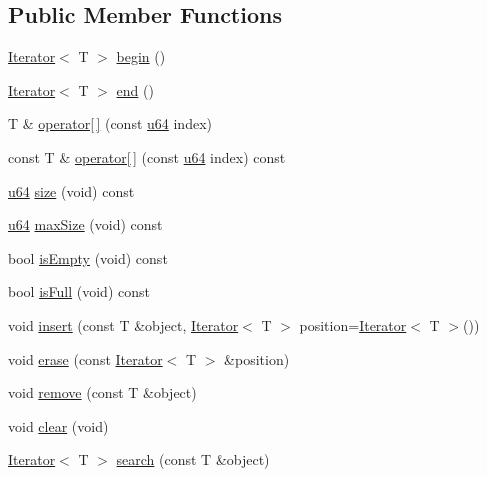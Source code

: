 \subsection*{Public Member Functions}
\begin{DoxyCompactItemize}
\item 
\hyperlink{class_iterator}{Iterator}$<$ T $>$ \hyperlink{classcrap_1_1container_1_1_list_acbb19f69f1378d0d36d9a4ea17595673}{begin} ()
\item 
\hyperlink{class_iterator}{Iterator}$<$ T $>$ \hyperlink{classcrap_1_1container_1_1_list_a59179e116c59aaed4737b4de74147f38}{end} ()
\item 
T \& \hyperlink{classcrap_1_1container_1_1_list_aa133af9cfb90b5f0c6068e5ae8532f70}{operator\mbox{[}$\,$\mbox{]}} (const \hyperlink{types_8h_a3f7e2bcbb0b4c338f3c4f6c937cd4234}{u64} index)
\item 
const T \& \hyperlink{classcrap_1_1container_1_1_list_a9e7bb6861d0c924cb09e06334ac7cce1}{operator\mbox{[}$\,$\mbox{]}} (const \hyperlink{types_8h_a3f7e2bcbb0b4c338f3c4f6c937cd4234}{u64} index) const
\item 
\hyperlink{types_8h_a3f7e2bcbb0b4c338f3c4f6c937cd4234}{u64} \hyperlink{classcrap_1_1container_1_1_list_a855e3d38e21983e3ab0863c1092a9e42}{size} (void) const
\item 
\hyperlink{types_8h_a3f7e2bcbb0b4c338f3c4f6c937cd4234}{u64} \hyperlink{classcrap_1_1container_1_1_list_aece5bc32f10eca22dd49d9d839169db9}{max\-Size} (void) const
\item 
bool \hyperlink{classcrap_1_1container_1_1_list_aa6fd5c6d2ae6e19efc1dfd922ae27dac}{is\-Empty} (void) const
\item 
bool \hyperlink{classcrap_1_1container_1_1_list_a075cfb60ae229966bafb6b83cca701a4}{is\-Full} (void) const
\item 
void \hyperlink{classcrap_1_1container_1_1_list_adbfe539bd526d187cc9f2b10e8b8a3ce}{insert} (const T \&object, \hyperlink{class_iterator}{Iterator}$<$ T $>$ position=\hyperlink{class_iterator}{Iterator}$<$ T $>$())
\item 
void \hyperlink{classcrap_1_1container_1_1_list_a5417a992ef49c142d5293a8f857dda0a}{erase} (const \hyperlink{class_iterator}{Iterator}$<$ T $>$ \&position)
\item 
void \hyperlink{classcrap_1_1container_1_1_list_a7a0522b71bd4e6525add9b6c1beaaa84}{remove} (const T \&object)
\item 
void \hyperlink{classcrap_1_1container_1_1_list_a596359562e35d7844d11919058b81d9c}{clear} (void)
\item 
\hyperlink{class_iterator}{Iterator}$<$ T $>$ \hyperlink{classcrap_1_1container_1_1_list_a4d995a30125a96c5613658bf2d74d515}{search} (const T \&object)
\end{DoxyCompactItemize}


